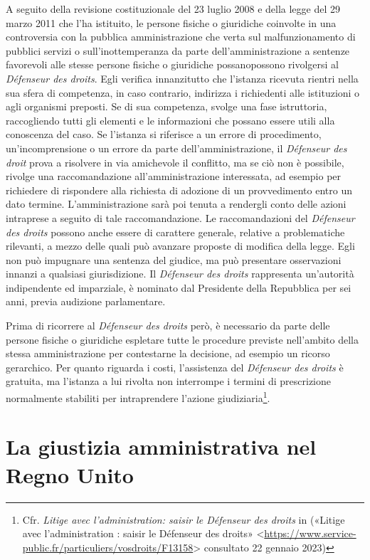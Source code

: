 \documentclass[12pt,it,a4paper,]{report}
\begin{document}
A seguito della revisione costituzionale del 23 luglio 2008 e della
legge del 29 marzo 2011 che l'ha istituito, le persone fisiche o
giuridiche coinvolte in una controversia con la pubblica amministrazione
che verta sul malfunzionamento di pubblici servizi o sull'inottemperanza
da parte dell'amministrazione a sentenze favorevoli alle stesse persone
fisiche o giuridiche possanopossono rivolgersi al \emph{Défenseur des
droits}. Egli verifica innanzitutto che l'istanza ricevuta rientri nella
sua sfera di competenza, in caso contrario, indirizza i richiedenti alle
istituzioni o agli organismi preposti. Se di sua competenza, svolge una
fase istruttoria, raccogliendo tutti gli elementi e le informazioni che
possano essere utili alla conoscenza del caso. Se l'istanza si riferisce
a un errore di procedimento, un'incomprensione o un errore da parte
dell'amministrazione, il \emph{Défenseur des droit} prova a risolvere in
via amichevole il conflitto, ma se ciò non è possibile, rivolge una
raccomandazione all'amministrazione interessata, ad esempio per
richiedere di rispondere alla richiesta di adozione di un provvedimento
entro un dato termine. L'amministrazione sarà poi tenuta a rendergli
conto delle azioni intraprese a seguito di tale raccomandazione. Le
raccomandazioni del \emph{Défenseur des droits} possono anche essere di
carattere generale, relative a problematiche rilevanti, a mezzo delle
quali può avanzare proposte di modifica della legge. Egli non può
impugnare una sentenza del giudice, ma può presentare osservazioni
innanzi a qualsiasi giurisdizione. Il \emph{Défenseur des droits}
rappresenta un'autorità indipendente ed imparziale, è nominato dal
Presidente della Repubblica per sei anni, previa audizione parlamentare.

Prima di ricorrere al \emph{Défenseur des droits} però, è necessario da
parte delle persone fisiche o giuridiche espletare tutte le procedure
previste nell'ambito della stessa amministrazione per contestarne la
decisione, ad esempio un ricorso gerarchico. Per quanto riguarda i
costi, l'assistenza del \emph{Défenseur des droits} è gratuita, ma
l'istanza a lui rivolta non interrompe i termini di prescrizione
normalmente stabiliti per intraprendere l'azione giudiziaria\footnote{Cfr.
  \emph{Litige avec l'administration: saisir le Défenseur des droits} in
  ({«Litige avec l'administration : saisir le Défenseur des droits»}
  \textless{}\url{https://www.service-public.fr/particuliers/vosdroits/F13158}\textgreater{}
  consultato 22 gennaio 2023)}.

\hypertarget{la-giustizia-amministrativa-nel-regno-unito}{%
\chapter{La giustizia amministrativa nel Regno
Unito}\label{la-giustizia-amministrativa-nel-regno-unito}}
\end{document}
